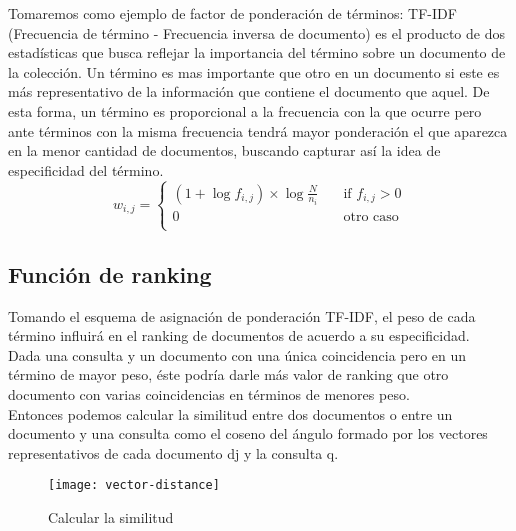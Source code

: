 Tomaremos como ejemplo de factor de ponderación de términos: TF-IDF (Frecuencia de término - Frecuencia inversa de documento) es el producto de dos estadísticas que busca reflejar la importancia del término sobre un documento de la colección. Un término es mas importante que otro en un documento si este es más representativo de la información que contiene el documento que aquel. De esta forma, un término es proporcional a la frecuencia con la que ocurre pero ante términos con la misma frecuencia tendrá mayor ponderación el que aparezca en la menor cantidad de documentos, buscando capturar así la idea de especificidad del término. \\


\[ w_{i,j} =
  \begin{cases}
    (1 + \log{f_{i,j}}) \times \log{\frac{N}{n_{i}}} & \quad \text{if } f_{i,j} > 0\\
    0  & \quad \text{otro caso}\\
  \end{cases}
\]


\subsection{Función de ranking}

Tomando el esquema de asignación de ponderación TF-IDF, el peso de cada término influirá en el ranking de documentos de acuerdo a su especificidad. \\ 

Dada una consulta y un documento con una única coincidencia pero en un término de mayor peso, éste podría darle más valor de ranking que otro documento con varias coincidencias en términos de menores peso. \\

Entonces podemos calcular la similitud entre dos documentos o entre un documento y una consulta como el coseno del ángulo formado por los vectores representativos de cada documento dj y la consulta q. 

				\begin{figure}[h]
					\texttt{[image: vector-distance]}
					\centering
					\caption{Calcular la similitud}
				\end{figure}


